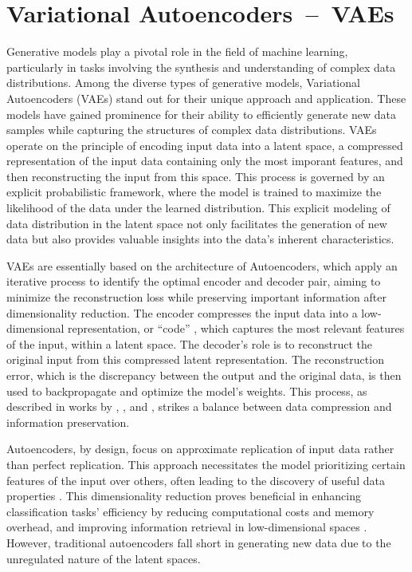 \section{Variational Autoencoders~--~VAEs}\label{VAEs}

Generative models play a pivotal role in the field of machine learning, particularly in tasks involving the synthesis and understanding of complex data distributions. Among the diverse types of generative models, Variational Autoencoders (VAEs) stand out for their unique approach and application. These models have gained prominence for their ability to efficiently generate new data samples while capturing the structures of complex data distributions. VAEs operate on the principle of encoding input data into a latent space, a compressed representation of the input data containing only the most imporant features, and then reconstructing the input from this space. This process is governed by an explicit probabilistic framework, where the model is trained to maximize the likelihood of the data under the learned distribution. This explicit modeling of data distribution in the latent space not only facilitates the generation of new data but also provides valuable insights into the data’s inherent characteristics. 

VAEs are essentially based on the architecture of Autoencoders, which apply an iterative process to identify the optimal encoder and decoder pair, aiming to minimize the reconstruction loss while preserving important information after dimensionality reduction. The encoder compresses the input data into a low-dimensional representation, or ``code'' \citep{hintonCode, GoodfellowDeepLearning}, which captures the most relevant features of the input, within a latent space. The decoder's role is to reconstruct the original input from this compressed latent representation. The reconstruction error, which is the discrepancy between the output and the original data, is then used to backpropagate and optimize the model's weights. This process, as described in works by \citeauthor{hintonCode}, \citeauthor{GoodfellowDeepLearning}, and \citeauthor{michelucci2022introduction}, strikes a balance between data compression and information preservation.

Autoencoders, by design, focus on approximate replication of input data rather than perfect replication. This approach necessitates the model prioritizing certain features of the input over others, often leading to the discovery of useful data properties \citep{GoodfellowDeepLearning}. This dimensionality reduction proves beneficial in enhancing classification tasks' efficiency by reducing computational costs and memory overhead, and improving information retrieval in low-dimensional spaces \citep{GoodfellowDeepLearning}. However, traditional autoencoders fall short in generating new data due to the unregulated nature of the latent spaces.


